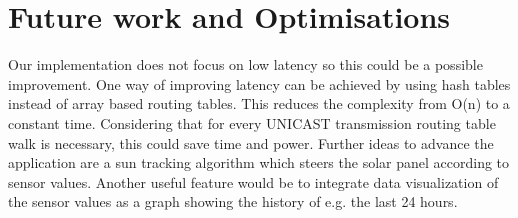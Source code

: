 \documentclass[conference]{IEEEtran}
\begin{document}
\section{Future work and Optimisations}
Our implementation does not focus on low latency so this could be a possible improvement. One way of improving latency can be achieved by using hash tables instead of array based routing tables. This reduces the complexity from O(n) to a constant time. Considering that for every UNICAST transmission routing table walk is necessary, this could save time and power. Further ideas to advance the application are a sun tracking algorithm which steers the solar panel according to sensor values. Another useful feature would be to integrate data visualization of the sensor values as a graph showing the history of e.g. the last 24 hours.


%
%



%
%
\end{document}
